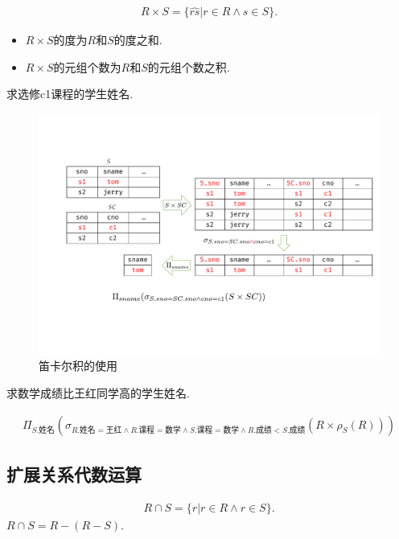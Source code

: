 \begin{definition}[笛卡尔积]
\begin{align*}
    R\times S=\{\widehat{rs}|r\in R\land s\in S\}.
\end{align*}
\begin{itemize}
    \item $R\times S$的度为$R$和$S$的度之和.
    \item $R\times S$的元组个数为$R$和$S$的元组个数之积.
\end{itemize}
\end{definition}

\begin{example}
求选修c1课程的学生姓名.
\end{example}

\begin{figure}[H]
    \centering
    \includegraphics[width=.75\textwidth]{./figure/笛卡尔积的使用.pdf}
    \caption{笛卡尔积的使用}
\end{figure}

\begin{example}
求数学成绩比王红同学高的学生姓名.
\end{example}
\begin{align*}
    \Pi_{S.\text{姓名}}\left(\sigma_{R.\text{姓名}=\text{王红}\land R.\text{课程}=\text{数学}\land S.\text{课程}=\text{数学} \land R.\text{成绩} < S.\text{成绩}} (R\times \rho_S(R))\right)
\end{align*}

\subsection{扩展关系代数运算}

\begin{definition}[交运算]
\begin{align*}
    R\cap S =\{r|r\in R\land r \in S\}.
\end{align*}
$R\cap S = R-(R-S)$.
\end{definition}

